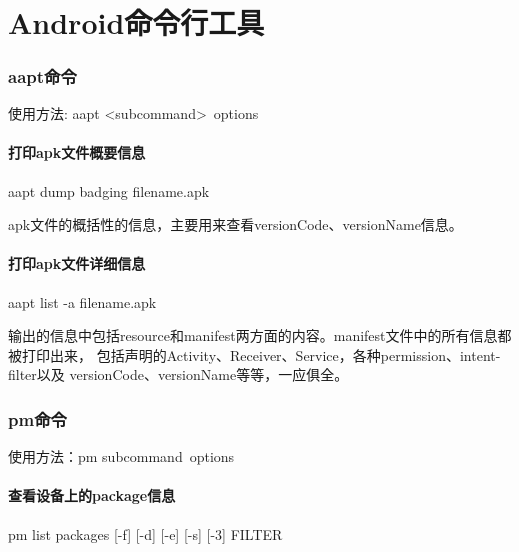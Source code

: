 ﻿\documentclass{article}
\author{孙延宾}
\date{\today}
\begin{document}
  \tt
  \begin{titlepage}
    \maketitle
  \end{titlepage}
  
  \part[Commands for Android]{Android命令行工具}
  \section[aapt - Android Asset Packaging Tool]{aapt命令}
  使用方法: aapt \textless subcommand\textgreater\ \lt options\gt
  \subsection[print apk file badging information]{打印apk文件概要信息}
  aapt dump badging filename.apk
  
  apk文件的概括性的信息，主要用来查看versionCode、versionName信息。
  
  \subsection[print apk file verbose information]{打印apk文件详细信息}
  aapt list -a filename.apk
  
  输出的信息中包括resource和manifest两方面的内容。manifest文件中的所有信息都被打印出来，
  包括声明的Activity、Receiver、Service，各种permission、intent-filter以及
  versionCode、versionName等等，一应俱全。
  
  \section[pm - Package Manager]{pm命令}
  使用方法：pm \lt subcommand\gt\ \lt options\gt
  
  \subsection[list packages]{查看设备上的package信息}
  pm list packages [-f] [-d] [-e] [-s] [-3] FILTER
  
\end{document}
